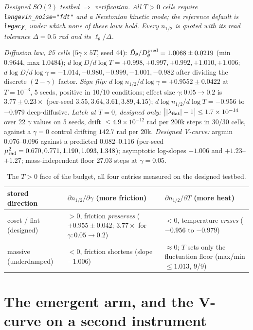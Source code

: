 \emph{Designed $SO(2)$ testbed $\Rightarrow$ verification. All $T>0$ cells require \texttt{langevin\_noise="fdt"} and a Newtonian kinetic mode; the reference default is \texttt{legacy}, under which none of these laws hold. Every $n_{1/2}$ is quoted with its read tolerance $\Delta=0.5$ rad and its $\ell_\theta/\Delta$.}

\emph{Diffusion law, 25 cells} ($5\gamma\times5T$, seed 44): $\hat D_\theta/D_\theta^{\rm pred}=1.0068\pm0.0219$ (min $0.9644$, max $1.0484$); $d\log D/d\log T=+0.998,+0.997,+0.992,+1.010,+1.006$; $d\log D/d\log\gamma=-1.014,-0.980,-0.999,-1.001,-0.982$ after dividing the discrete $(2-\gamma)$ factor. \emph{Sign flip:} $d\log n_{1/2}/d\log\gamma=+0.9552\pm0.0422$ at $T=10^{-3}$, 5 seeds, positive in 10/10 conditions; effect size $\gamma:0.05\to0.2$ is $3.77\pm0.23\times$ (per-seed $3.55,3.64,3.61,3.89,4.15$); $d\log n_{1/2}/d\log T=-0.956$ to $-0.979$ deep-diffusive. \emph{Latch at $T=0$, designed only:} $\big||\lambda_{\rm flat}|-1\big|\le1.7\times10^{-14}$ over 22 $\gamma$ values on 5 seeds, drift $\le4.9\times10^{-12}$ rad per 200k steps in 30/30 cells, against a $\gamma=0$ control drifting $142.7$ rad per 20k. \emph{Designed V-curve:} argmin $0.076$--$0.096$ against a predicted $0.082$--$0.116$ (per-seed $\mu^2_{\rm rad}=0.670,0.771,1.190,1.093,1.348$); asymptotic log-slopes $-1.006$ and $+1.23$--$+1.27$; mass-independent floor $27.03$ steps at $\gamma=0.05$.

\begin{table}[!htb]\centering\scriptsize
\caption{The $T>0$ face of the budget, all four entries measured on the designed testbed.}
\begin{tabular}{lll}
\toprule
stored direction & $\partial n_{1/2}/\partial\gamma$ (more friction) & $\partial n_{1/2}/\partial T$ (more heat)\\
\midrule
coset / flat (designed) & $>0$, friction \emph{preserves} ($+0.955\pm0.042$; $3.77\times$ for $\gamma:0.05\to0.2$) & $<0$, temperature \emph{erases} ($-0.956$ to $-0.979$)\\
massive (underdamped) & $<0$, friction shortens (slope $-1.006$) & $\approx0$; $T$ sets only the fluctuation floor (max/min $\le1.013$, 9/9)\\
\bottomrule
\end{tabular}
\end{table}

\section{The emergent arm, and the V-curve on a second instrument}\label{app:emergent}

